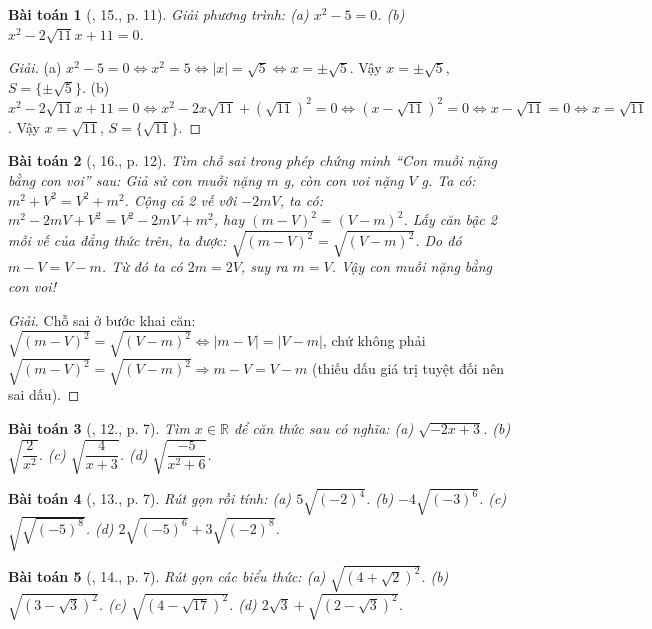 \documentclass{article}
\newtheorem{baitoan}{Bài toán}
\begin{document}
\begin{baitoan}[\cite{SGK_Toan_9_tap_1}, 15., p. 11]
	 Giải phương trình: (a) $x^2 - 5 = 0$. (b) $x^2 - 2\sqrt{11}x + 11 = 0$.
\end{baitoan}

\begin{proof}[Giải]
	(a) $x^2 - 5 = 0\Leftrightarrow x^2 = 5\Leftrightarrow|x| = \sqrt{5}\Leftrightarrow x = \pm\sqrt{5}$. Vậy $x = \pm\sqrt{5}$, $S = \{\pm\sqrt{5}\}$. (b) $x^2 - 2\sqrt{11}x + 11 = 0\Leftrightarrow x^2 - 2x\sqrt{11} + (\sqrt{11})^2 = 0\Leftrightarrow(x - \sqrt{11})^2 = 0\Leftrightarrow x - \sqrt{11} = 0\Leftrightarrow x = \sqrt{11}$. Vậy $x = \sqrt{11}$, $S = \{\sqrt{11}\}$.
\end{proof}

\begin{baitoan}[\cite{SGK_Toan_9_tap_1}, 16., p. 12]
	Tìm chỗ sai trong phép chứng minh ``Con muỗi nặng bằng con voi'' sau: Giả sử con muỗi nặng $m$ \emph{g}, còn con voi nặng $V$ \emph{g}. Ta có: $m^2 + V^2 = V^2 + m^2$. Cộng cả 2 vế với $-2mV$, ta có: $m^2 - 2mV + V^2 = V^2 - 2mV + m^2$, hay $(m - V)^2 = (V - m)^2$. Lấy căn bậc 2 mỗi vế của đẳng thức trên, ta được: $\sqrt{(m - V)^2} = \sqrt{(V - m)^2}$. Do đó $m - V = V - m$. Từ đó ta có $2m = 2V$, suy ra $m = V$. Vậy con muỗi nặng bằng con voi!
\end{baitoan}

\begin{proof}[Giải]
	Chỗ sai ở bước khai căn: $\sqrt{(m - V)^2} = \sqrt{(V - m)^2}\Leftrightarrow|m - V| = |V - m|$, chứ không phải $\sqrt{(m - V)^2} = \sqrt{(V - m)^2}\Rightarrow m - V = V - m$ (thiếu dấu giá trị tuyệt đối nên sai dấu).
\end{proof}

\begin{baitoan}[\cite{SBT_Toan_9_tap_1}, 12., p. 7]
	 Tìm $x\in\mathbb{R}$ để căn thức sau có nghĩa: (a) $\sqrt{-2x + 3}$. (b) $\sqrt{\dfrac{2}{x^2}}$. (c) $\sqrt{\dfrac{4}{x + 3}}$. (d) $\sqrt{\dfrac{-5}{x^2 + 6}}$.
\end{baitoan}

\begin{baitoan}[\cite{SBT_Toan_9_tap_1}, 13., p. 7]
	Rút gọn rồi tính: (a) $5\sqrt{(-2)^4}$. (b) $-4\sqrt{(-3)^6}$. (c) $\sqrt{\sqrt{(-5)^8}}$. (d) $2\sqrt{(-5)^6} + 3\sqrt{(-2)^8}$.
\end{baitoan}

\begin{baitoan}[\cite{SBT_Toan_9_tap_1}, 14., p. 7]
	Rút gọn các biểu thức: (a) $\sqrt{(4 + \sqrt{2})^2}$. (b) $\sqrt{(3 - \sqrt{3})^2}$. (c) $\sqrt{(4 - \sqrt{17})^2}$. (d) $2\sqrt{3} + \sqrt{(2 - \sqrt{3})^2}$.
\end{baitoan}
\end{document}
